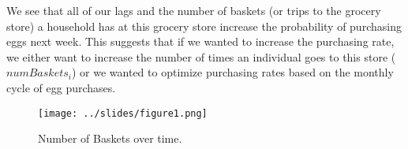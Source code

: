 \documentclass[11pt]{article}
\begin{document}
We see that all of our lags and the number of baskets (or trips to the
grocery store) a household has at this grocery store increase the probability
of purchasing eggs next week. This suggests that if we wanted to increase the
purchasing rate, we either want to increase the number of times an individual
goes to this store ($numBaskets_{i}$) or we wanted to optimize purchasing
rates based on the monthly cycle of egg purchases.

\begin{figure}[H]
    \centering
    \texttt{[image: ../slides/figure1.png]}
    \caption{Number of Baskets over time.}
\end{figure}
\end{document}
